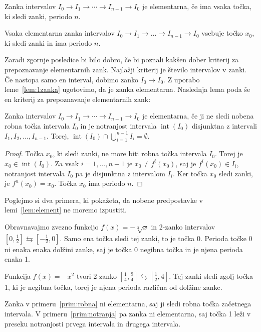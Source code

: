 \documentclass[mat2]{fmfdelo}
\DeclareMathOperator{\interior}{int}
\begin{document}
\begin{definicija}\label{def:element}
Zanka intervalov $I_0 \to I_1 \to \cdots \to I_{n-1} \to I_0$ je elementarna, če ima vsaka točka, ki sledi zanki, periodo $n$.
\end{definicija}

\begin{posledica}
Vsaka elementarna zanka intervalov $I_0 \to I_1 \to \dots \to I_{n-1} \to I_0$ vsebuje točko $x_0$, ki sledi zanki in ima periodo $n$.
\end{posledica}

Zaradi zgornje posledice bi bilo dobro, če bi poznali kakšen dober kriterij za prepoznavanje elementarnih zank. Najlažji kriterij je število intervalov v zanki. Če nastopa samo en interval, dobimo zanko $I_0 \to I_0$. Z uporabo leme~\ref{lem:1zanka} ugotovimo, da je zanka elementarna. Naslednja lema poda še en kriterij za prepoznavanje elementarnih zank:

\begin{lema}\label{lem:element}
Zanka intervalov $I_0 \to I_1 \to \cdots \to I_{n-1} \to I_0$ je elementarna, če ji ne sledi nobena robna točka intervala $I_0$ in je notranjost intervala $\interior(I_0)$ disjunktna z intervali $I_1, I_2,  \dots, I_{n-1}$. Torej, $\interior(I_0) \cap \bigcup_{i=1}^{n-1}I_i = \emptyset$.
\end{lema}
\begin{proof}
Točka $x_0$, ki sledi zanki, ne more biti robna točka intervala $I_0$. Torej je $x_0 \in \interior(I_0)$. Za vsak $i=1, \dots, n-1$ je $x_0 \neq f^i(x_0)$, saj je $f^i(x_0) \in I_i$, notranjost intervala $I_0$ pa je disjunktna z intervalom $I_i$. Ker točka $x_0$ sledi zanki, je $f^n(x_0)=x_0$. Točka $x_0$ ima periodo $n$.
\end{proof}

Poglejmo si dva primera, ki pokažeta, da nobene predpostavke v lemi~\ref{lem:element} ne moremo izpustiti.

\begin{primer}\label{prim:robna}
Obravnavajmo zvezno funkcijo $f(x) = -\sqrt[3]{x}$ in 2-zanko intervalov $[0, \frac{1}{2}] \leftrightarrows [-\frac{1}{2}, 0]$. Samo ena točka sledi tej zanki, to je točka 0. Perioda točke 0 ni enaka enaka dolžini zanke, saj je točka 0 negibna točka in je njena perioda enaka 1.
\end{primer}
\begin{primer}\label{prim:notranja}
Funkcija $f(x) = - x^2$ tvori $2$-zanko $[\frac{1}{4}, \frac{9}{4}] \leftrightarrows [\frac{1}{2}, 4]$. Tej zanki sledi zgolj točka $1$, ki je negibna točka, torej je njena perioda različna od dolžine zanke.
\end{primer}
Zanka v primeru~\ref{prim:robna} ni elementarna, saj ji sledi robna točka začetnega intervala. V primeru~\ref{prim:notranja} pa zanka ni elementarna, saj točka 1 leži v preseku notranjosti prvega intervala in drugega intervala. 
\end{document}
